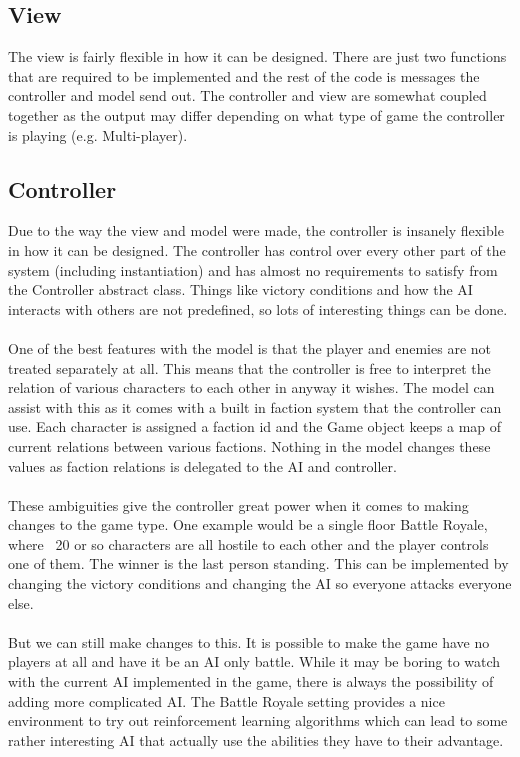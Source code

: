 \documentclass[12pt]{article}
\begin{document}
\subsection*{View}

The view is fairly flexible in how it can be designed. There are just two functions that are required to be implemented and the rest of the code is messages the controller and model send out. The controller and view are somewhat coupled together as the output may differ depending on what type of game the controller is playing (e.g. Multi-player).

\subsection*{Controller}

Due to the way the view and model were made, the controller is insanely flexible in how it can be designed. The controller has control over every other part of the system (including instantiation) and has almost no requirements to satisfy from the Controller abstract class. Things like victory conditions and how the AI interacts with others are not predefined, so lots of interesting things can be done.  \\
\\
One of the best features with the model is that the player and enemies are not treated separately at all. This means that the controller is free to interpret the relation of various characters to each other in anyway it wishes. The model can assist with this as it comes with a built in faction system that the controller can use. Each character is assigned a faction id and the Game object keeps a map of current relations between various factions. Nothing in the model changes these values as faction relations is delegated to the AI and controller.\\
\\
These ambiguities give the controller great power when it comes to making changes to the game type. One example would be a single floor Battle Royale, where ~20 or so characters are all hostile to each other and the player controls one of them. The winner is the last person standing. This can be implemented by changing the victory conditions and changing the AI so everyone attacks everyone else.\\
\\
But we can still make changes to this. It is possible to make the game have no players at all and have it be an AI only battle. While it may be boring to watch with the current AI implemented in the game, there is always the possibility of adding more complicated AI. The Battle Royale setting provides a nice environment to try out reinforcement learning algorithms which can lead to some rather interesting AI that actually use the abilities they have to their advantage.\\
\end{document}
